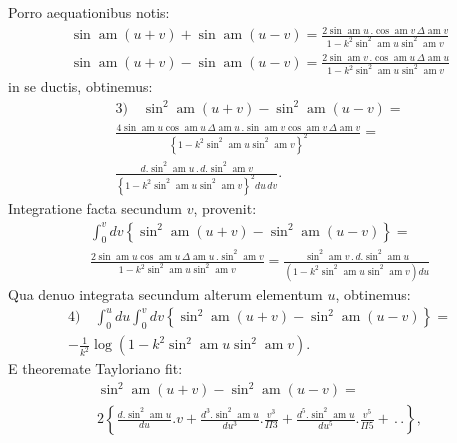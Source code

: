 \documentclass{article}
\begin{document}
Porro aequationibus notis:
\[
\begin{gathered}
\sin\operatorname{am}(u+v)+\sin\operatorname{am}(u-v)=\frac{2\sin\operatorname{am}u\,.\cos\operatorname{am}v\,\Delta\operatorname{am}v}{1-k^{2}\sin^{2}\operatorname{am}u\sin^{2}\operatorname{am}v}\\[1.5ex]
\sin\operatorname{am}(u+v)-\sin\operatorname{am}(u-v)=\frac{2\sin\operatorname{am}v\,.\cos\operatorname{am}u\,\Delta\operatorname{am}u}{1-k^{2}\sin^{2}\operatorname{am}u\sin^{2}\operatorname{am}v}
\end{gathered}
\]
in se ductis, obtinemus:
\[
\begin{gathered}
\text{3)}\quad\sin^{2}\operatorname{am}(u+v)-\sin^{2}\operatorname{am}(u-v)=\\[1.5ex]
\frac{4\sin\operatorname{am}u\cos\operatorname{am}u\,\Delta\operatorname{am}u\,.\sin\operatorname{am}v\cos\operatorname{am}v\,\Delta\operatorname{am}v}{\left\{1-k^{2}\sin^{2}\operatorname{am}u\sin^{2}\operatorname{am}v\right\}^{2}}=\\[1.5ex]
\frac{d.\sin^{2}\operatorname{am}u\,.\,d.\sin^{2}\operatorname{am}v}{\left\{1-k^{2}\sin^{2}\operatorname{am}u\sin^{2}\operatorname{am}v\right\}^{2}du\,dv}.
\end{gathered}
\]
Integratione facta secundum $v$, provenit:
\[
\begin{gathered}
\int_{0}^{v}dv\left\{\sin^{2}\operatorname{am}(u+v)-\sin^{2}\operatorname{am}(u-v)\right\}=\\[1.5ex]
\frac{2\sin\operatorname{am}u\cos\operatorname{am}u\,\Delta\operatorname{am}u\,.\sin^{2}\operatorname{am}v}{1-k^{2}\sin^{2}\operatorname{am}u\sin^{2}\operatorname{am}v}=\frac{\sin^{2}\operatorname{am}v\,.\,d.\sin^{2}\operatorname{am}u}{\left(1-k^{2}\sin^{2}\operatorname{am}u\sin^{2}\operatorname{am}v\right)du}
\end{gathered}
\]
Qua denuo integrata secundum alterum elementum $u$, obtinemus:
\[
\begin{gathered}
\text{4)}\quad\int_{0}^{u}du\int_{0}^{v}dv\left\{\sin^{2}\operatorname{am}(u+v)-\sin^{2}\operatorname{am}(u-v)\right\}=\\[1.5ex]
-\frac{1}{k^{2}}\log\left(1-k^{2}\sin^{2}\operatorname{am}u\sin^{2}\operatorname{am}v\right).
\end{gathered}
\]
E theoremate Tayloriano fit:
\[
\begin{gathered}
\sin^{2}\operatorname{am}(u+v)-\sin^{2}\operatorname{am}(u-v)=\\[1.5ex]
2\left\{\frac{d.\sin^{2}\operatorname{am}u}{du}.v+\frac{d^{3}.\sin^{2}\operatorname{am}u}{du^{3}}.\frac{v^{3}}{\Pi 3}+\frac{d^{5}.\sin^{2}\operatorname{am}u}{du^{5}}.\frac{v^{5}}{\Pi 5}+\,.\,.\right\},
\end{gathered}
\]
\end{document}
